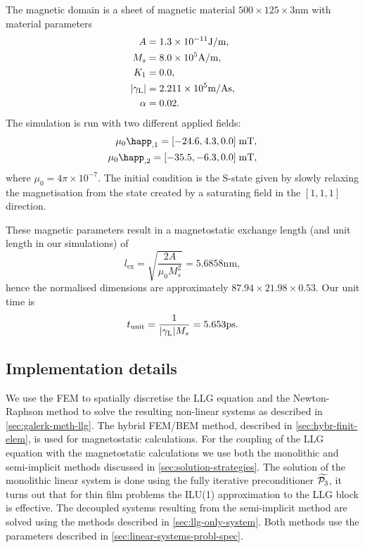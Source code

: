 The magnetic domain is a sheet of magnetic material $500 \times 125 \times 3$nm with material parameters
\begin{equation}
  \begin{aligned}
    A &= 1.3\times 10^{-11} \text{J/m}, \\
    M_s &= 8.0\times 10^{5} \text{A/m}, \\
    K_1 &= 0.0, \\
    {\left|{\gamma_{\mathrm{\tiny{L}}}} \right|} &= 2.211 \times 10^{5} \text{m/As}, \\
    \alpha &= 0.02.
  \end{aligned}
\end{equation}
The simulation is run with two different applied fields:
\begin{equation}
  \begin{aligned}
    \mu_0 \happ_{,1} = [-24.6, 4.3, 0.0] \;\text{mT}, \\
    \mu_0 \happ_{,2} = [-35.5, -6.3, 0.0] \;\text{mT}, \\
  \end{aligned}
  \label{eq:mumag-h-app}
\end{equation}
where $\mu_0 = 4\pi\times10^{-7}$.
The initial condition is the S-state given by slowly relaxing the magnetisation from the state created by a saturating field in the $[1,1,1]$ direction.

These magnetic parameters result in a magnetostatic exchange length (and unit length in our simulations) of
\begin{equation}
  l_{\text{ex}} = \sqrt{\frac{2A}{\mu_0 M_s^2}} = 5.6858\text{nm},
\end{equation}
hence the normalised dimensions are approximately $87.94 \times 21.98 \times 0.53$.
Our unit time is
\begin{equation}
  t_{\text{unit}} = \frac{1}{{\left|{\gamma_{\mathrm{\tiny{L}}}} \right|} M_s} = 5.653\text{ps}.
\end{equation}


\subsection{Implementation details}

We use the FEM to spatially discretise the LLG equation and the Newton-Raphson method to solve the resulting non-linear systems as described in \cref{sec:galerk-meth-llg}.
The hybrid FEM/BEM method, described in \cref{sec:hybr-finit-elem}, is used for magnetostatic calculations.
For the coupling of the LLG equation with the magnetostatic calculations we use both the monolithic and semi-implicit methods discussed in \cref{sec:solution-strategies}.
The solution of the monolithic linear system is done using the fully iterative preconditioner $\widetilde{\mathcal{P}_3}$, it turns out that for thin film problems the ILU(1) approximation to the LLG block is effective.
The decoupled systems resulting from the semi-implicit method are solved using the methods described in \cref{sec:llg-only-system}.
Both methods use the parameters described in \cref{sec:linear-systems-probl-spec}.

